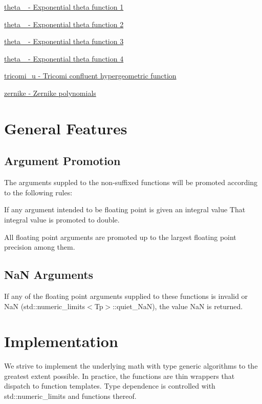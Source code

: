 \begin{DoxyItemize}
\item \hyperlink{group__gnu__math__spec__func_gaa2e5a3a5f550fe032a596a8b01c878c0}{theta\+\_ -\/ Exponential theta function 1}
\item \hyperlink{group__gnu__math__spec__func_ga16f278edeb2842d614bae1f1ae2d0256}{theta\+\_ -\/ Exponential theta function 2}
\item \hyperlink{group__gnu__math__spec__func_ga146c3b8e86991e164d4bf143cda5f0fc}{theta\+\_ -\/ Exponential theta function 3}
\item \hyperlink{group__gnu__math__spec__func_ga8a6f8b69272a9f205a13e1745832ada3}{theta\+\_ -\/ Exponential theta function 4}
\item \hyperlink{group__gnu__math__spec__func_gaf51a13fad85006e4d65c5b117e49f7d8}{tricomi\+\_\+u -\/ Tricomi confluent hypergeometric function}
\item \hyperlink{group__gnu__math__spec__func_gaaed33f29c1eb1d2c5b9590fe2e57151c}{zernike -\/ Zernike polynomials}
\end{DoxyItemize}\hypertarget{index_general}{}\section{General Features}\label{index_general}
\hypertarget{index_promotion}{}\subsection{Argument Promotion}\label{index_promotion}
The arguments suppled to the non-\/suffixed functions will be promoted according to the following rules\+:
\begin{DoxyEnumerate}
\item If any argument intended to be floating point is given an integral value That integral value is promoted to double.
\item All floating point arguments are promoted up to the largest floating point precision among them.
\end{DoxyEnumerate}\hypertarget{index_NaN}{}\subsection{Na\+N Arguments}\label{index_NaN}
If any of the floating point arguments supplied to these functions is invalid or NaN (std\+::numeric\+\_\+limits$<$\+Tp$>$\+::quiet\+\_\+\+NaN), the value NaN is returned.\hypertarget{index_impl}{}\section{Implementation}\label{index_impl}
We strive to implement the underlying math with type generic algorithms to the greatest extent possible. In practice, the functions are thin wrappers that dispatch to function templates. Type dependence is controlled with std\+::numeric\+\_\+limits and functions thereof.

